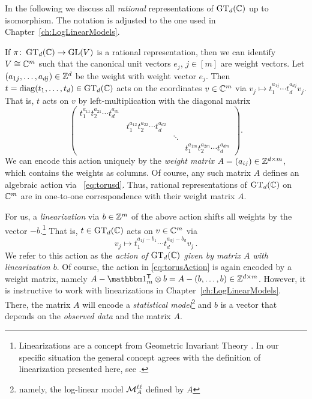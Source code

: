 \begin{example} \label{ex:GeneralGTaction}
	In the following we discuss all \emph{rational} representations of $\operatorname{GT}_d(\mathbb C)$ up to isomorphism. The notation is adjusted to the one used in Chapter~\ref{ch:LogLinearModels}.
 	
 	If $\pi \colon \operatorname{GT}_d(\mathbb C) \to \operatorname{GL}(V)$ is a rational representation, then we can identify $V \cong \mathbb C^m$ such that the canonical unit vectors $e_j$, $j \in [m]$ are weight vectors. Let $(a_{1j}, \ldots, a_{dj}) \in \mathbb Z^d$ be the weight with weight vector $e_j$. Then $t = \operatorname{diag}(t_1, \ldots, t_d) \in \operatorname{GT}_d(\mathbb C)$ acts on the coordinates $v \in \mathbb C^m$ via $v_j \mapsto t_1^{a_{1j}}  \cdots t_d^{a_{dj}} v_j$. That is, $t$ acts on $v$ by left-multiplication with the diagonal matrix
 	\begin{equation} \label{eq:torusd}
 		\begin{pmatrix} t_1^{a_{11}} t_2^{a_{21}} \cdots t_d^{a_{d1}} & & & \\ & t_1^{a_{12}} t_2^{a_{22}} \cdots t_d^{a_{d2}} & & \\ & & \ddots & \\ & & & t_1^{a_{1m}} t_2^{a_{2m}} \cdots t_d^{a_{dm}} \end{pmatrix} .
 	\end{equation}
 	We can encode this action uniquely by the \emph{weight matrix}	$A = (a_{ij}) \in \mathbb Z^{d \times m}$, which contains the weights as columns. Of course, any such matrix $A$ defines an algebraic action via ~\eqref{eq:torusd}.
	Thus, rational representations of $\operatorname{GT}_d(\mathbb C)$ on $\mathbb C^m$ are in one-to-one correspondence with their weight matrix $A$.
	
	For us, a \emph{linearization} via $b \in \mathbb Z^m$ of the above action shifts all weights by the vector $-b$.\footnote{Linearizations are a concept from Geometric Invariant Theory \cite[Chapter~7]{DolgachevBook}. In our specific situation the general concept agrees with the definition of linearization presented here, see \cite[Remark~3.3]{DiscretePaper}.}
	That is, $t \in \operatorname{GT}_d(\mathbb C)$ acts on $v \in \mathbb C^m$ via
		 \begin{equation}
		 	\label{eq:torusAction}
		 	v_j \mapsto t_1^{a_{1j}-b_1}  \cdots t_d^{a_{dj}-b_d} v_j \, .
		 \end{equation}
	We refer to this action as the \emph{action of $\operatorname{GT}_d(\mathbb C)$ given by matrix $A$ with linearization $b$}. Of course, the action in \eqref{eq:torusAction} is again encoded by a weight matrix, namely $A - \ones_m\T \otimes b = A - (b,\ldots,b) \in \ZZ^{d \times m}$.	However, it is instructive to work with linearizations in Chapter~\ref{ch:LogLinearModels}. There, the matrix $A$ will encode a \emph{statistical model}\footnote{namely, the log-linear model $\mathcal{M}^{\mathtt{\ell \ell}}_A$ defined by $A$}
	and $b$ is a vector that depends on the \emph{observed data} and the matrix $A$.
	\hfill\exSymbol
\end{example}

